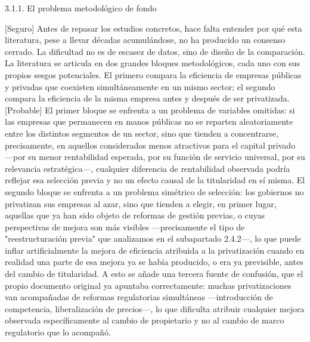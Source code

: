 \documentclass[10pt,a4paper]{article}
\begin{document}
3.1.1. El problema metodológico de fondo

[Seguro] Antes de repasar los estudios concretos, hace falta entender por qué esta literatura, pese a llevar décadas acumulándose, no ha producido un consenso cerrado. La dificultad no es de escasez de datos, sino de diseño de la comparación. La literatura se articula en dos grandes bloques metodológicos, cada uno con sus propios sesgos potenciales. El primero compara la eficiencia de empresas públicas y privadas que coexisten simultáneamente en un mismo sector; el segundo compara la eficiencia de la misma empresa antes y después de ser privatizada. [Probable] El primer bloque se enfrenta a un problema de variables omitidas: si las empresas que permanecen en manos públicas no se reparten aleatoriamente entre los distintos segmentos de un sector, sino que tienden a concentrarse, precisamente, en aquellos considerados menos atractivos para el capital privado —por su menor rentabilidad esperada, por su función de servicio universal, por su relevancia estratégica—, cualquier diferencia de rentabilidad observada podría reflejar esa selección previa y no un efecto causal de la titularidad en sí misma. El segundo bloque se enfrenta a un problema simétrico de selección: los gobiernos no privatizan sus empresas al azar, sino que tienden a elegir, en primer lugar, aquellas que ya han sido objeto de reformas de gestión previas, o cuyas perspectivas de mejora son más visibles —precisamente el tipo de "reestructuración previa" que analizamos en el subapartado 2.4.2—, lo que puede inflar artificialmente la mejora de eficiencia atribuida a la privatización cuando en realidad una parte de esa mejora ya se había producido, o era ya previsible, antes del cambio de titularidad. A esto se añade una tercera fuente de confusión, que el propio documento original ya apuntaba correctamente: muchas privatizaciones van acompañadas de reformas regulatorias simultáneas —introducción de competencia, liberalización de precios—, lo que dificulta atribuir cualquier mejora observada específicamente al cambio de propietario y no al cambio de marco regulatorio que lo acompañó.
\end{document}
